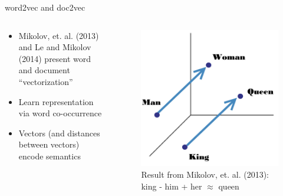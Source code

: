 \documentclass{beamer}
\begin{document}
\begin{frame}{word2vec and doc2vec}

\begin{columns}
	\begin{column}{0.5\textwidth}
		\begin{itemize}
			\item Mikolov, et. al. (2013) and Le and Mikolov (2014) present word and document \textquotedblleft vectorization\textquotedblright
			\item Learn representation via word co-occurrence
			\item Vectors (and distances between vectors) encode semantics
		\end{itemize}
	\end{column}
	\begin{column}{0.5\textwidth}
			\begin{figure}
				\includegraphics[width=\textwidth]{wordembedding.jpg}
				\caption{Result from Mikolov, et. al. (2013): king - him + her $\approx$ queen}
			\end{figure}
	\end{column}
\end{columns}


\end{frame}
\end{document}
